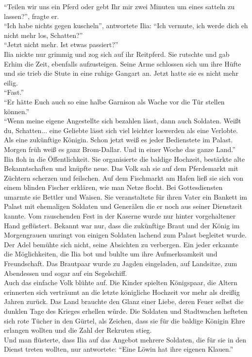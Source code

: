 ``Teilen wir uns ein Pferd oder gebt Ihr mir zwei Minuten um eines satteln zu lassen?'', fragte 
er.\\
``Ich habe nichts gegen kuscheln'', antwortete Ilia: ``Ich vermute, ich werde dich eh nicht mehr 
los, Schatten?''\\
``Jetzt nicht mehr. Ist etwas passiert?''\\
Ilia nickte nur grimmig und zog sich auf ihr Reitpferd. Sie rutschte und gab Erhim die Zeit, 
ebenfalls aufzusteigen. Seine Arme schlossen sich um ihre Hüfte und sie trieb die Stute in eine 
ruhige Gangart an. Jetzt hatte sie es nicht mehr eilig.\\
``Fast.''\\
``Er hätte Euch auch so eine halbe Garnison als Wache vor die Tür stellen können.''\\
``Wenn meine eigene Angestellte sich bezahlen lässt, dann auch Soldaten. Weißt du, Schatten... eine 
Geliebte lässt sich viel leichter loswerden als eine Verlobte. Als eine zukünftige Königin. Schon 
jetzt weiß es jeder Bedienstete im Palast. Morgen früh weiß es ganz Brom-Dallar. Und in einer Woche 
das ganze Land.''\\

Ilia floh in die Öffentlichkeit. Sie organisierte die baldige Hochzeit, bestärkte alte 
Bekanntschaften und knüpfte neue. Das Volk sah sie auf dem Pferdemarkt mit Züchtern scherzen und 
feilschen. Auf dem Fischmarkt am Hafen ließ sie sich von einem blinden Fischer erklären, wie man 
Netze flocht. Bei Gottesdiensten umarmte sie Bettler und Waisen. Sie veranstaltete für ihren Vater 
ein Bankett im Palast mit ehemaligen Soldaten und Generälen die er noch aus seiner Dienstzeit 
kannte. Vom rauschenden Fest in der Kaserne wurde nur hinter vorgehaltener Hand geflüstert. Bekannt 
war nur, dass die zukünftige Braut und der König im Morgengrauen umringt von einigen Soldaten 
lachend zum Palast begleitet wurde.\\
Der Adel bemühte sich nicht, seine Absichten zu verbergen. Ein jeder erkannte die Möglichkeiten, 
die Ilia bot und buhlte um ihre Aufmerksamkeit und Freundschaft. Das Brautpaar wurde zu Jagden 
eingeladen, auf Landsitze, zum Abendessen und sogar auf ein Segelschiff.\\
Auch das einfache Volk blühte auf. Die Kinder spielten Königspaar, die Altern erinnerten sich 
verträumt an die letzte königliche Hochzeit vor mehr als dreißig Jahren zurück. Das Land brauchte 
den Glanz einer Liebe, deren Feuer selbst die dunklen Tage des Krieges erhellen würde. Die Soldaten 
und Stadtwachen hefteten sich rote Tücher in den Gürtel, als Zeichen, dass sie für die baldige 
Königin Ehre erlangen wollten und die Zahl der Rekruten stieg.\\
Und man flüsterte, dass Ilia auf das Angebot mehrere Soldaten, die für sie in den Dienst 
treten wollten, nur antwortete: ``Eine Löwin hat ihre eigenen Klauen.''
